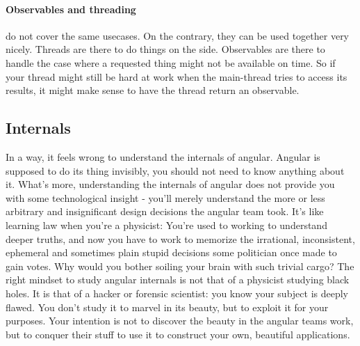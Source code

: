 \paragraph{Observables and threading} do not cover the same usecases. On the contrary, they can be used together very nicely. Threads are there to do things on the side. Observables are there to handle the case where a requested thing might not be available on time. So if your thread might still be hard at work when the main-thread tries to access its results, it might make sense to have the thread return an observable. 


\subsection{Internals}
In a way, it feels wrong to understand the internals of angular. Angular is supposed to do its thing invisibly, you should not need to know anything about it. What's more, understanding the internals of angular does not provide you with some technological insight - you'll merely understand the more or less arbitrary and insignificant design decisions the angular team took. It's like learning law when you're a physicist: You're used to working to understand deeper truths, and now you have to work to memorize the irrational, inconsistent, ephemeral and sometimes plain stupid decisions some politician once made to gain votes. Why would you bother soiling your brain with such trivial cargo?
The right mindset to study angular internals is not that of a physicist studying black holes. It is that of a hacker or forensic scientist: you know your subject is deeply flawed. You don't study it to marvel in its beauty, but to exploit it for your purposes. Your intention is not to discover the beauty in the angular teams work, but to conquer their stuff to use it to construct your own, beautiful applications. 

